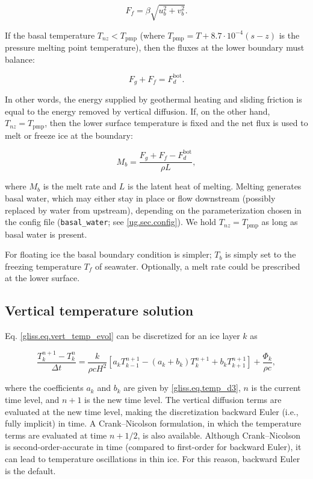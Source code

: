 \begin{equation}
  F_f = \beta \sqrt{u_b^2 + v_b^2}.
\end{equation}

If the basal temperature $T_{nz} < T_{\mathrm{pmp}}$ 
(where $T_{\mathrm{pmp}} = T + 8.7\cdot 10^{-4}(s-z)$ is the pressure melting point temperature),
then the fluxes at the lower boundary must balance:

\begin{equation}
  F_g + F_f = F_{d}^{\mathrm{bot}}.
\end{equation}

\noindent
In other words, the energy supplied by geothermal heating and sliding friction is equal
to the energy removed by vertical diffusion.
If, on the other hand, $T_{nz} = T_{\mathrm{pmp}}$, then the
lower surface temperature is fixed and the net flux is used to melt or freeze ice at the boundary:

\begin{equation}
  \label{gliss.eq.basal_melt}
  M_b = \frac{F_g + F_f - F_d^{\mathrm{bot}}}{\rho L},
\end{equation}
 
\noindent
where $M_b$ is the melt rate and $L$ is the latent heat of melting.
Melting generates basal water, which may either stay in place or flow downstream
(possibly replaced by water from upstream), depending on the
parameterization chosen in the config file (\texttt{basal\_water}; see \ref{ug.sec.config}).
We hold $T_{nz} = T_{\mathrm{pmp}}$ as long as basal water is present.

For floating ice the basal boundary condition is simpler; $T_b$ is simply
set to the freezing temperature $T_f$ of seawater. Optionally, a melt rate could
be prescribed at the lower surface.

\subsection{Vertical temperature solution}

Eq. \eqref{gliss.eq.vert_temp_evol} can be discretized for an ice layer $k$ as

\begin{equation}
  \label{gliss.eq.dTdt1}
  \frac{T_{k}^{n+1}-T_{k}^{n}}{\Delta t} =
  \frac{k}{\rho c H^2}\left[ {{a}_{k}}T_{k-1}^{n+1}-({{a}_{k}}+{{b}_{k}})T_{k}^{n+1}+{{b}_{k}}T_{k+1}^{n+1} \right]+\frac{{{\Phi }_{k}}}{\rho c},
\end{equation}

\noindent
where the coefficients $a_k$ and $b_k$ are given by \eqref{gliss.eq.temp_d3}, $n$ is the current time level,
and $n+1$ is the new time level.  The vertical diffusion terms are evaluated at the new time level,
making the discretization backward Euler (i.e., fully implicit) in time.  A Crank--Nicolson formulation, in which the temperature
terms are evaluated at time $n+1/2$, is also available.  Although Crank--Nicolson is second-order-accurate
in time (compared to first-order for backward Euler), it can lead to temperature oscillations in thin ice.
For this reason, backward Euler is the default.


